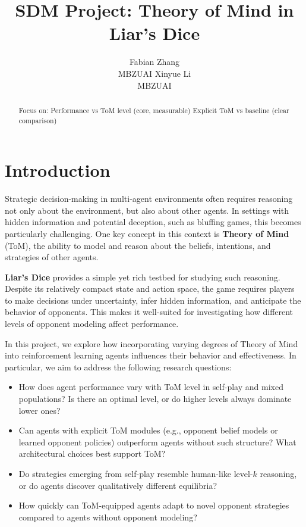 \documentclass{article}
\title{SDM Project: Theory of Mind in Liar’s Dice}
\author{%
  Fabian Zhang\\MBZUAI
  \And
  Xinyue Li\\MBZUAI
}
\begin{document}
\maketitle
\begin{abstract}

Focus on:
Performance vs ToM level (core, measurable)
Explicit ToM vs baseline (clear comparison)
\end{abstract}

\section{Introduction}

Strategic decision-making in multi-agent environments often requires reasoning not only about the environment, but also about other agents. In settings with hidden information and potential deception, such as bluffing games, this becomes particularly challenging. One key concept in this context is \textbf{Theory of Mind} (ToM), the ability to model and reason about the beliefs, intentions, and strategies of other agents.

\textbf{Liar’s Dice} provides a simple yet rich testbed for studying such reasoning. Despite its relatively compact state and action space, the game requires players to make decisions under uncertainty, infer hidden information, and anticipate the behavior of opponents. This makes it well-suited for investigating how different levels of opponent modeling affect performance.

In this project, we explore how incorporating varying degrees of Theory of Mind into reinforcement learning agents influences their behavior and effectiveness. In particular, we aim to address the following research questions:

\begin{itemize}
    \item How does agent performance vary with ToM level in self-play and mixed populations? Is there an optimal level, or do higher levels always dominate lower ones?
    
    \item Can agents with explicit ToM modules (e.g., opponent belief models or learned opponent policies) outperform agents without such structure? What architectural choices best support ToM?
    
    \item Do strategies emerging from self-play resemble human-like level-$k$ reasoning, or do agents discover qualitatively different equilibria?
    
    \item How quickly can ToM-equipped agents adapt to novel opponent strategies compared to agents without opponent modeling?
\end{itemize}
\end{document}
